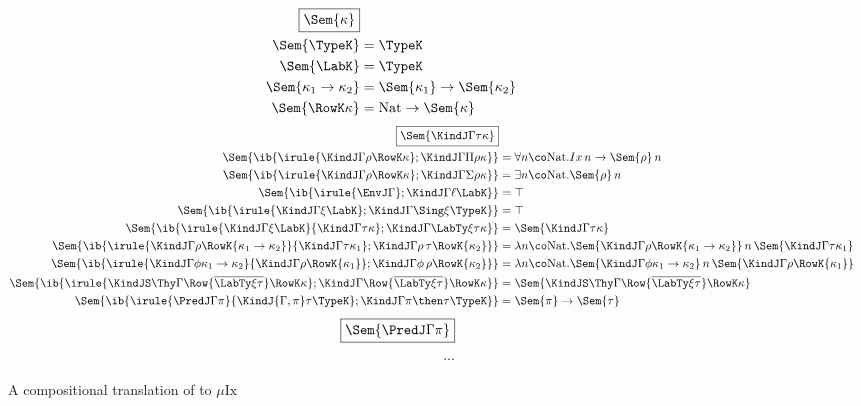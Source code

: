 \documentclass[12pt]{article}
\newcommand\Nat{\mathrm{Nat}}
\newcommand\Ix{\mathrm{Ix}}
\newcommand\MuIx{\ensuremath{\mu\Ix}}
\begin{document}
\begin{figure}[H]
\begin{align*}
\fbox{$\Sem{\kappa}$} \\
\vspace{5em}
\Sem{\TypeK} &= \TypeK \\
\Sem{\LabK} &= \TypeK \\
\Sem{\kappa_1 \to \kappa_2} &= \Sem{\kappa_1} \to \Sem{\kappa_2} \\
\Sem{\RowK \kappa} &= \Nat \to \Sem{\kappa} \\
\end{align*}
\begin{align*}
\fbox{$\Sem{\KindJ \Gamma \tau \kappa}$} \\
\vspace{5em}
\Sem{\ib{\irule
          {\KindJ \Gamma \rho {\RowK \kappa}};
          {\KindJ \Gamma {\Pi\rho} \kappa}}} &= {\forall n \co \Nat. Ix \, n \to \Sem{\rho} \, n} \\
\Sem{\ib{\irule
          {\KindJ \Gamma \rho {\RowK \kappa}};
          {\KindJ \Gamma {\Sigma\rho} \kappa}}} &= {\exists n \co \Nat. \Sem{\rho} \, n} \\
\Sem{\ib{\irule
          {\EnvJ \Gamma};
          {\KindJ \Gamma \ell \LabK}}} &= \top \\
\Sem{\ib{\irule
          {\KindJ \Gamma \xi \LabK};
          {\KindJ \Gamma {\Sing\xi} \TypeK}}} &= \top \\
\Sem{\ib{\irule
          {\KindJ \Gamma \xi \LabK}
          {\KindJ \Gamma \tau \kappa};
          {\KindJ \Gamma {\LabTy \xi \tau} \kappa}}} &= \Sem{\KindJ \Gamma {\tau} \kappa} \\
\Sem{\ib{\irule
          {\KindJ \Gamma \rho {\RowK{\kappa_1 \to \kappa_2}}}
          {\KindJ \Gamma \tau {\kappa_1}};
          {\KindJ \Gamma {\rho\,\tau} {\RowK{\kappa_2}}}}} &= \lambda n \co \Nat. \Sem{\KindJ \Gamma \rho {\RowK{\kappa_1 \to \kappa_2}}} \, n \, \Sem{{\KindJ \Gamma \tau {\kappa_1}}} \\
\Sem{\ib{\irule
          {\KindJ \Gamma \phi {\kappa_1 \to \kappa_2}}
          {\KindJ \Gamma \rho {\RowK{\kappa_1}}};
          {\KindJ \Gamma {\phi\,\rho} {\RowK{\kappa_2}}}}} &= \lambda n \co \Nat. \Sem{{\KindJ \Gamma \phi {\kappa_1 \to \kappa_2}}} \, n \, \Sem{{\KindJ \Gamma \rho {\RowK{\kappa_1}}}} \\
\Sem{\ib{\irule
          {\KindJS \Thy \Gamma {\Row {\overline {\LabTy \xi \tau}}} {\RowK \kappa}};
          {\KindJ \Gamma {\Row{\overline {\LabTy \xi \tau}}} {\RowK\kappa}}}} &= \Sem{\KindJS \Thy \Gamma {\Row {\overline {\LabTy \xi \tau}}} {\RowK \kappa}} \\
\Sem{\ib{\irule
          {\PredJ \Gamma \pi}
          {\KindJ {\Gamma, \pi} \tau \TypeK};
          {\KindJ \Gamma {\pi \then \tau} \TypeK}}} &= \Sem{\pi} \to \Sem{\tau}
\end{align*}
\begin{align*}
\fbox{$\Sem{\PredJ \Gamma \pi}$} \\
\vspace{5em}
...
\end{align*}
\caption{A compositional translation of \RO to \MuIx{}}
\label{fig:translation}
\end{figure}
\end{document}
